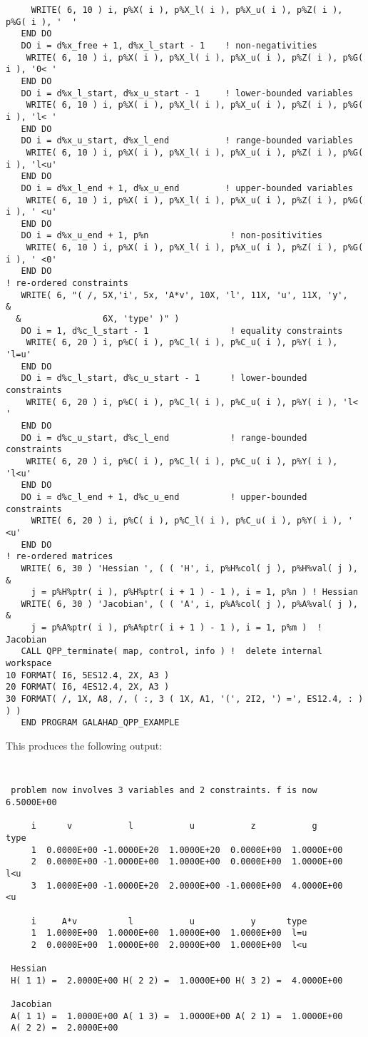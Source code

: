 \documentclass{galahad}
\begin{document}
{\begin{verbatim}
     WRITE( 6, 10 ) i, p%X( i ), p%X_l( i ), p%X_u( i ), p%Z( i ), p%G( i ), '  '
   END DO
   DO i = d%x_free + 1, d%x_l_start - 1    ! non-negativities
    WRITE( 6, 10 ) i, p%X( i ), p%X_l( i ), p%X_u( i ), p%Z( i ), p%G( i ), '0< '
   END DO
   DO i = d%x_l_start, d%x_u_start - 1     ! lower-bounded variables
    WRITE( 6, 10 ) i, p%X( i ), p%X_l( i ), p%X_u( i ), p%Z( i ), p%G( i ), 'l< '
   END DO
   DO i = d%x_u_start, d%x_l_end           ! range-bounded variables
    WRITE( 6, 10 ) i, p%X( i ), p%X_l( i ), p%X_u( i ), p%Z( i ), p%G( i ), 'l<u'
   END DO
   DO i = d%x_l_end + 1, d%x_u_end         ! upper-bounded variables
    WRITE( 6, 10 ) i, p%X( i ), p%X_l( i ), p%X_u( i ), p%Z( i ), p%G( i ), ' <u'
   END DO
   DO i = d%x_u_end + 1, p%n                ! non-positivities
    WRITE( 6, 10 ) i, p%X( i ), p%X_l( i ), p%X_u( i ), p%Z( i ), p%G( i ), ' <0'
   END DO
! re-ordered constraints
   WRITE( 6, "( /, 5X,'i', 5x, 'A*v', 10X, 'l', 11X, 'u', 11X, 'y',            &
  &                6X, 'type' )" )
   DO i = 1, d%c_l_start - 1                ! equality constraints
    WRITE( 6, 20 ) i, p%C( i ), p%C_l( i ), p%C_u( i ), p%Y( i ), 'l=u'
   END DO
   DO i = d%c_l_start, d%c_u_start - 1      ! lower-bounded constraints
    WRITE( 6, 20 ) i, p%C( i ), p%C_l( i ), p%C_u( i ), p%Y( i ), 'l< '
   END DO
   DO i = d%c_u_start, d%c_l_end            ! range-bounded constraints
    WRITE( 6, 20 ) i, p%C( i ), p%C_l( i ), p%C_u( i ), p%Y( i ), 'l<u'
   END DO
   DO i = d%c_l_end + 1, d%c_u_end          ! upper-bounded constraints
     WRITE( 6, 20 ) i, p%C( i ), p%C_l( i ), p%C_u( i ), p%Y( i ), ' <u'
   END DO
! re-ordered matrices
   WRITE( 6, 30 ) 'Hessian ', ( ( 'H', i, p%H%col( j ), p%H%val( j ),          &
     j = p%H%ptr( i ), p%H%ptr( i + 1 ) - 1 ), i = 1, p%n ) ! Hessian
   WRITE( 6, 30 ) 'Jacobian', ( ( 'A', i, p%A%col( j ), p%A%val( j ),          &
     j = p%A%ptr( i ), p%A%ptr( i + 1 ) - 1 ), i = 1, p%m )  ! Jacobian
   CALL QPP_terminate( map, control, info ) !  delete internal workspace
10 FORMAT( I6, 5ES12.4, 2X, A3 )
20 FORMAT( I6, 4ES12.4, 2X, A3 )
30 FORMAT( /, 1X, A8, /, ( :, 3 ( 1X, A1, '(', 2I2, ') =', ES12.4, : ) ) )
   END PROGRAM GALAHAD_QPP_EXAMPLE
\end{verbatim}
}
\noindent
This produces the following output:
{\tt \small
\begin{verbatim}
 problem now involves 3 variables and 2 constraints. f is now 6.5000E+00 
 
     i      v           l           u           z           g      type
     1  0.0000E+00 -1.0000E+20  1.0000E+20  0.0000E+00  1.0000E+00
     2  0.0000E+00 -1.0000E+00  1.0000E+00  0.0000E+00  1.0000E+00  l<u
     3  1.0000E+00 -1.0000E+20  2.0000E+00 -1.0000E+00  4.0000E+00   <u

     i     A*v          l           u           y      type
     1  1.0000E+00  1.0000E+00  1.0000E+00  1.0000E+00  l=u
     2  0.0000E+00  1.0000E+00  2.0000E+00  1.0000E+00  l<u

 Hessian
 H( 1 1) =  2.0000E+00 H( 2 2) =  1.0000E+00 H( 3 2) =  4.0000E+00

 Jacobian
 A( 1 1) =  1.0000E+00 A( 1 3) =  1.0000E+00 A( 2 1) =  1.0000E+00
 A( 2 2) =  2.0000E+00
\end{verbatim}
}
\end{document}
